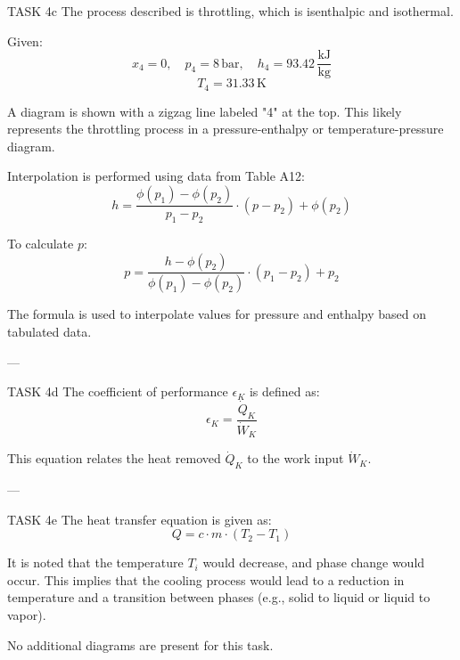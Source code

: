 TASK 4c  
The process described is throttling, which is isenthalpic and isothermal.  

Given:  
\[
x_4 = 0, \quad p_4 = 8 \, \text{bar}, \quad h_4 = 93.42 \, \frac{\text{kJ}}{\text{kg}}
\]  
\[
T_4 = 31.33 \, \text{K}
\]  

A diagram is shown with a zigzag line labeled "4" at the top. This likely represents the throttling process in a pressure-enthalpy or temperature-pressure diagram.  

Interpolation is performed using data from Table A12:  
\[
h = \frac{\phi(p_1) - \phi(p_2)}{p_1 - p_2} \cdot (p - p_2) + \phi(p_2)
\]  

To calculate \( p \):  
\[
p = \frac{h - \phi(p_2)}{\phi(p_1) - \phi(p_2)} \cdot (p_1 - p_2) + p_2
\]  

The formula is used to interpolate values for pressure and enthalpy based on tabulated data.  

---

TASK 4d  
The coefficient of performance \( \epsilon_K \) is defined as:  
\[
\epsilon_K = \frac{\dot{Q}_K}{\dot{W}_K}
\]  

This equation relates the heat removed \( \dot{Q}_K \) to the work input \( \dot{W}_K \).  

---

TASK 4e  
The heat transfer equation is given as:  
\[
Q = c \cdot m \cdot (T_2 - T_1)
\]  

It is noted that the temperature \( T_i \) would decrease, and phase change would occur. This implies that the cooling process would lead to a reduction in temperature and a transition between phases (e.g., solid to liquid or liquid to vapor).  

No additional diagrams are present for this task.